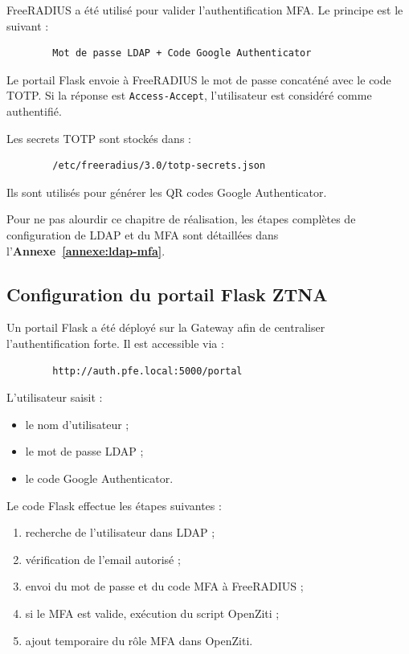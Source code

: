 \documentclass[12pt,a4paper,oneside]{report}
\begin{document}
	FreeRADIUS a été utilisé pour valider l'authentification MFA. Le principe est le suivant :
	
	\begin{lstlisting}
		Mot de passe LDAP + Code Google Authenticator
	\end{lstlisting}
	
	Le portail Flask envoie à FreeRADIUS le mot de passe concaténé avec le code TOTP. Si la réponse est \texttt{Access-Accept}, l'utilisateur est considéré comme authentifié.
	
	Les secrets TOTP sont stockés dans :
	
	\begin{lstlisting}
		/etc/freeradius/3.0/totp-secrets.json
	\end{lstlisting}
	
	Ils sont utilisés pour générer les QR codes Google Authenticator.
	
	Pour ne pas alourdir ce chapitre de réalisation, les étapes complètes de configuration de LDAP et du MFA sont détaillées dans l'\textbf{Annexe~\ref{annexe:ldap-mfa}}.
	
	\subsection{Configuration du portail Flask ZTNA}
	
	Un portail Flask a été déployé sur la Gateway afin de centraliser l'authentification forte. Il est accessible via :
	
	\begin{lstlisting}
		http://auth.pfe.local:5000/portal
	\end{lstlisting}
	
	L'utilisateur saisit :
	
	\begin{itemize}
		\item le nom d'utilisateur ;
		\item le mot de passe LDAP ;
		\item le code Google Authenticator.
	\end{itemize}
	
	Le code Flask effectue les étapes suivantes :
	
	\begin{enumerate}
		\item recherche de l'utilisateur dans LDAP ;
		\item vérification de l'email autorisé ;
		\item envoi du mot de passe et du code MFA à FreeRADIUS ;
		\item si le MFA est valide, exécution du script OpenZiti ;
		\item ajout temporaire du rôle MFA dans OpenZiti.
	\end{enumerate}
	
\end{document}
